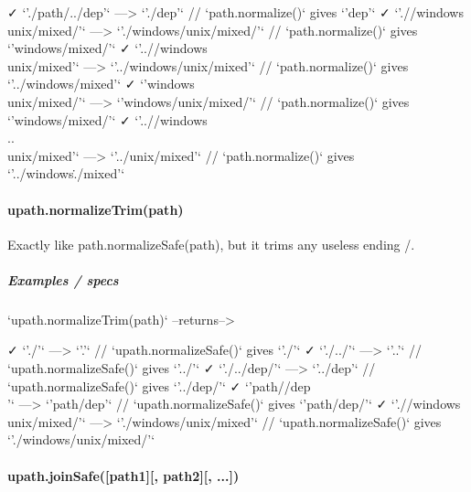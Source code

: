 \begin{DoxyVerb}
    ✓ `'./path/../dep'`                  --->                      `'./dep'`  // `path.normalize()` gives `'dep'`
    ✓ `'.//windows\\unix/mixed/'`        --->      `'./windows/unix/mixed/'`  // `path.normalize()` gives `'windows\unix/mixed/'`
    ✓ `'..//windows\\unix/mixed'`        --->      `'../windows/unix/mixed'`  // `path.normalize()` gives `'../windows\unix/mixed'`
    ✓ `'windows\\unix/mixed/'`           --->        `'windows/unix/mixed/'`  // `path.normalize()` gives `'windows\unix/mixed/'`
    ✓ `'..//windows\\..\\unix/mixed'`    --->              `'../unix/mixed'`  // `path.normalize()` gives `'../windows\..\unix/mixed'`
\end{DoxyVerb}


\paragraph*{{\ttfamily upath.\+normalize\+Trim(path)}}

Exactly like {\ttfamily path.\+normalize\+Safe(path)}, but it trims any useless ending {\ttfamily /}.

\subparagraph*{Examples / specs}

\begin{DoxyVerb}`upath.normalizeTrim(path)`        --returns-->

    ✓ `'./'`                          --->                         `'.'`  // `upath.normalizeSafe()` gives `'./'`
    ✓ `'./../'`                       --->                        `'..'`  // `upath.normalizeSafe()` gives `'../'`
    ✓ `'./../dep/'`                   --->                    `'../dep'`  // `upath.normalizeSafe()` gives `'../dep/'`
    ✓ `'path//dep\\'`                 --->                  `'path/dep'`  // `upath.normalizeSafe()` gives `'path/dep/'`
    ✓ `'.//windows\\unix/mixed/'`     --->      `'./windows/unix/mixed'`  // `upath.normalizeSafe()` gives `'./windows/unix/mixed/'`
\end{DoxyVerb}


\paragraph*{{\ttfamily upath.\+join\+Safe(\mbox{[}path1\mbox{]}\mbox{[}, path2\mbox{]}\mbox{[}, ...\mbox{]})}}

